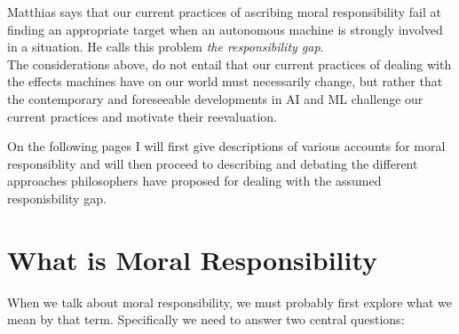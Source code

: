 \documentclass{article}
\begin{document}
Matthias says that our current practices of ascribing moral responsibility
fail at finding an appropriate target when an autonomous machine is
strongly involved in a situation. He calls this problem \textit{the
responsibility gap}.\\

The considerations above, do not entail that our current practices of
dealing with the effects machines have on our world must necessarily change,
but rather that the contemporary and foreseeable developments in AI and ML
challenge our current practices and motivate their reevaluation.

On the following pages I will first give descriptions of various accounts for
moral responsiblity and will then proceed to describing and debating the
different approaches philosophers have proposed for dealing with the assumed
responisbility gap.

%
%
%
%
%

\section{What is Moral Responsibility}
When we talk about moral responsibility, we must probably first explore what we
mean by that term. Specifically we need to answer two central questions:\\
\end{document}
